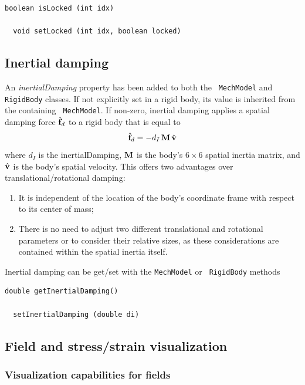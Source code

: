\documentclass{article}
\begin{document}
\begin{lstlisting}[]
  boolean isLocked (int idx)

  void setLocked (int idx, boolean locked)
\end{lstlisting}

\subsection*{Inertial damping}	

An {\it inertialDamping} property has been added to both the {\tt
MechModel} and {\tt RigidBody} classes. If not explicitly set in a
rigid body, its value is inherited from the containing {\tt
MechModel}. If non-zero, inertial damping applies a spatial damping
force $\hat{{\bf f}}_d$ to a rigid body that is equal to
%
\begin{equation}
\hat{{\bf f}}_d = -d_I \, {\bf M} \, \hat{{\bf v}}
\end{equation}
%
where $d_I$ is the {\sf inertialDamping}, ${\bf M}$ is the body's $6 \times
6$ spatial inertia matrix, and $\hat{{\bf v}}$ is the body's spatial
velocity. This offers two advantages over translational/rotational damping:

\begin{enumerate}

\item It is independent of the location of the body's coordinate
frame with respect to its center of mass;

\item 
There is no need to adjust two different translational and rotational
parameters or to consider their relative sizes, as these
considerations are contained within the spatial inertia itself.

\end{enumerate}

Inertial damping can be get/set with the {\tt MechModel} or {\tt
RigidBody} methods
%
\begin{lstlisting}[]
  double getInertialDamping()

  setInertialDamping (double di)
\end{lstlisting}
%

\subsection*{Field and stress/strain visualization}

\subsubsection{Visualization capabilities for fields}
\end{document}
